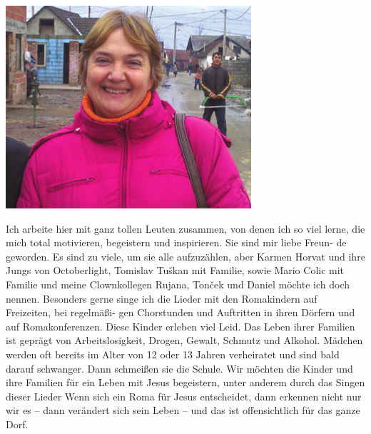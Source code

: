 \documentclass[a4paper,twoside, svgnames]{article}
\begin{document}
\begin{multicols}{2}
\begin{onehalfspacing}
\begin{justify}
\begin{center}
\includegraphics[width=\linewidth]{images/karmen}
\end{center}
Ich arbeite hier mit ganz tollen Leuten zusammen, von denen ich so viel lerne,
die mich total motivieren, begeistern und inspirieren. Sie sind mir liebe Freun-
de geworden. Es sind zu viele, um sie alle aufzuzählen, aber Karmen Horvat
und ihre Jungs von Octoberlight, Tomislav Tuškan mit Familie, sowie Mario
Colic mit Familie und
meine Clownkollegen
Rujana, Tonček und
Daniel möchte ich
doch nennen.
Besonders gerne singe
ich die Lieder mit den
Romakindern auf Freizeiten, bei regelmäßi-
gen Chorstunden und Auftritten in ihren
Dörfern und auf Romakonferenzen. Diese
Kinder erleben viel Leid. Das Leben ihrer
Familien ist geprägt von Arbeitslosigkeit,
Drogen, Gewalt, Schmutz und Alkohol.
Mädchen werden oft bereits im Alter von
12 oder 13 Jahren verheiratet und sind bald
darauf schwanger. Dann schmeißen sie die
Schule. Wir möchten die Kinder und ihre
Familien für ein Leben mit Jesus begeistern,
unter anderem durch das Singen dieser Lieder
Wenn sich ein Roma für Jesus entscheidet,
dann erkennen nicht nur wir es – dann verändert sich sein Leben – und das ist offensichtlich für das
ganze Dorf.\\
\textit{}


\end{justify}
\end{onehalfspacing}
\end{multicols}
\end{document}
